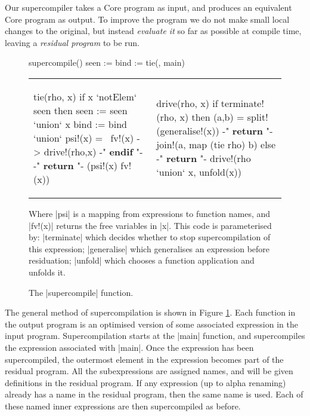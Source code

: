 Our supercompiler takes a Core program as input, and produces an equivalent Core program as output. To improve the program we do not make small local changes to the original, but instead \textit{evaluate it} so far as possible at compile time, leaving a \textit{residual program} to be run.

\begin{figure}
\begin{code}
supercompile()
    seen := {}
    bind := {}
    tie({}, main)
\end{code}

\vspace{-6mm}

\begin{tabular}{p{6.9cm}p{5cm}}
\begin{code}
tie(rho, x)
    if x `notElem` seen then
        seen := seen `union` {x}
        bind := bind `union` {psi\!!(x) = \ fv\!!(x) -> drive\!!(rho,x)}
    {-" \textsf{\textbf{endif}} "-}
    {-" \textsf{\textbf{return }} "-} (psi\!!(x) fv\!!(x))
\end{code}
&
\begin{code}
drive(rho, x)
    if terminate\!!(rho, x) then
        (a,b) = split\!!(generalise\!!(x))
        {-" \textsf{\textbf{return }} "-} join\!!(a, map (tie rho) b)
    else
        {-" \textsf{\textbf{return }} "-} drive\!!(rho `union` {x}, unfold(x))
\end{code}
\end{tabular}

\vspace{-3mm}

Where |psi| is a mapping from expressions to function names, and |fv\!!(x)| returns the free variables in |x|. This code is parameterised by: |terminate| which decides whether to stop supercompilation of this expression; |generalise| which generalises an expression before residuation; |unfold| which chooses a function application and unfolds it.
\vspace{3mm}
\caption{The |supercompile| function.}
\label{fig:supercompile}
\end{figure}

The general method of supercompilation is shown in Figure \ref{fig:supercompile}. Each function in the output program is an optimised version of some associated expression in the input program. Supercompilation starts at the |main| function, and supercompiles the expression associated with |main|. Once the expression has been supercompiled, the outermost element in the expression becomes part of the residual program. All the subexpressions are assigned names, and will be given definitions in the residual program. If any expression (up to alpha renaming) already has a name in the residual program, then the same name is used. Each of these named inner expressions are then supercompiled as before.

